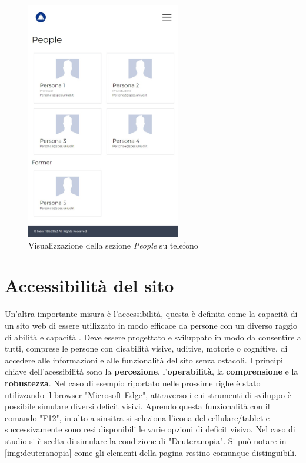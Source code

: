 \documentclass[target=bach,aauheader=]{thud}
\begin{document}
\begin{figure}
    \centering
    \includegraphics[width = 0.6\textwidth]{images/people-tablet.png}
    \caption{Visualizzazione della sezione \textit{People} su telefono}
    \label{img:computertab}
\end{figure}

\section{Accessibilità del sito}
Un'altra importante misura è l'accessibilità, questa è definita come la capacità di un sito web di essere utilizzato in modo efficace da persone con un diverso raggio di abilità e capacità \cite{campoverde2023accessibility}.
Deve essere progettato e sviluppato in modo da consentire a tutti, comprese le persone con disabilità visive, uditive, motorie o cognitive, di accedere alle informazioni e alle funzionalità del sito senza ostacoli.
\newline
I principi chiave dell'acessibilità sono la \textbf{percezione}, l'\textbf{operabilità}, la \textbf{comprensione} e la \textbf{robustezza}.
\newline \newline
Nel caso di esempio riportato nelle prossime righe è stato utilizzando il browser "Microsoft Edge", attraverso i cui strumenti di sviluppo è possibile simulare diversi deficit visivi.  
Aprendo questa funzionalità con il comando "F12", in alto a sinsitra si seleziona l'icona del cellulare/tablet e successivamente sono resi disponibili le varie opzioni di deficit visivo. 
Nel caso di studio si è scelta di simulare la condizione di "Deuteranopia". 
Si può notare in \cref{img:deuteranopia} come gli elementi della pagina restino comunque distinguibili.  
\end{document}
